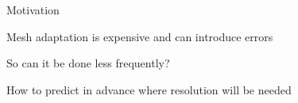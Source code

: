 \begin{slide}{Motivation}

\begin{list0}

    \item Mesh adaptation is expensive and can introduce errors

    \item So can it be done less frequently?

    \item How to predict in advance where resolution will be needed

\end{list0}

\end{slide}
